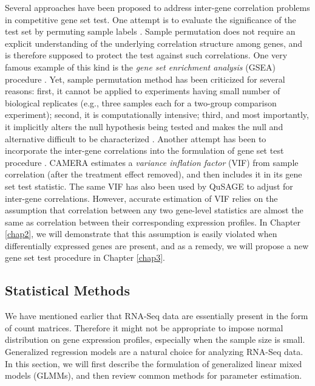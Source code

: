 Several approaches have been proposed to address inter-gene correlation problems in competitive gene
set test. One attempt is to evaluate the significance of the test set by permuting sample labels
\citep{efron2007testing,gatti2010heading,subramanian2005gene}. Sample permutation does not require
an explicit understanding of the underlying correlation structure among genes, and is therefore
supposed to protect the test against such correlations. One very famous example of this kind is the
\textit{gene set enrichment analysis} (GSEA) procedure \citep{subramanian2005gene}. Yet, sample
permutation method has been criticized for several reasons: first, it cannot be applied to
experiments having small
number of biological replicates (e.g., three samples each for a two-group comparison experiment);
second, it is computationally intensive; third, and most
importantly, it implicitly alters the null hypothesis being tested and makes the null and
alternative difficult to be characterized \citep{goeman2007analyzing, khatri2012ten, wu2012camera}.
Another attempt has been to incorporate the inter-gene correlations into the formulation of gene set
test procedure \citep{wu2012camera,yaari2013quantitative}. CAMERA \citep{wu2012camera} estimates a
\textit{variance
	inflation factor} (VIF) from sample correlation (after the treatment effect removed), and then
includes it in its gene set test statistic. The same VIF has also been used by QuSAGE
\cite{yaari2013quantitative} 
to adjust for inter-gene correlations. However, accurate estimation of VIF relies on
the assumption that correlation between any two gene-level statistics are almost the same as
correlation between their corresponding expression profiles. In Chapter \ref{chap2}, we will
demonstrate that this assumption is easily violated when differentially expressed genes are present,
and as a remedy, we will propose a new gene set test procedure in Chapter \ref{chap3}.  

\subsection{Statistical Methods}\label{subsec:glmm}
We have mentioned earlier that RNA-Seq data are essentially present in the form of count matrices. Therefore it might not be appropriate to impose normal distribution on gene expression profiles, especially when the sample size is small. Generalized regression models are a natural choice for 
analyzing RNA-Seq data.
In this section, we will first describe the formulation of generalized linear mixed models (GLMMs),
and then review common methods for parameter estimation.

